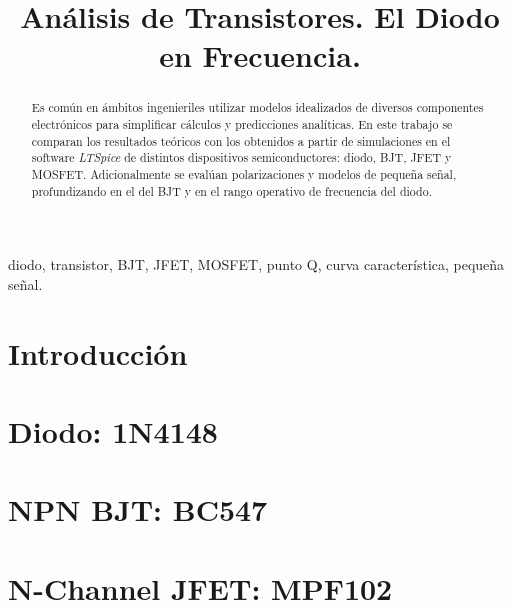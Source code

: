 \documentclass[conference]{IEEEtran}
\begin{document}
\title{Análisis de Transistores. El Diodo en Frecuencia.}
\author{
\and
{}
}

\maketitle

\begin{abstract}
Es común en ámbitos ingenieriles utilizar modelos idealizados de diversos componentes electrónicos para simplificar cálculos y predicciones analíticas. En este trabajo se comparan los resultados teóricos con los obtenidos a partir de simulaciones en el software \emph{LTSpice} de distintos dispositivos semiconductores: diodo, BJT, JFET y MOSFET. Adicionalmente se evalúan polarizaciones y modelos de pequeña señal, profundizando en el del BJT y en el rango operativo de frecuencia del diodo.
\end{abstract}

\begin{IEEEkeywords}
diodo, transistor, BJT, JFET, MOSFET, punto Q, curva característica, pequeña señal.
\end{IEEEkeywords}

\section{Introducción}


\section{Diodo: 1N4148}


\section{NPN BJT: BC547}


\section{N-Channel JFET: MPF102}

\end{document}
